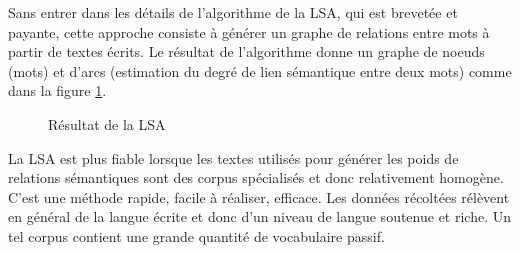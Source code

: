 \documentclass[a4paper,11pt,french]{article}
\begin{document}
Sans entrer dans les détails de l'algorithme de la LSA, qui est brevetée et payante, cette approche consiste à générer un graphe de relations entre mots à partir de textes écrits. Le résultat de l'algorithme donne un graphe de noeuds (mots) et d'arcs (estimation du degré de lien sémantique entre deux mots) comme dans la figure \ref{fig:lsa}.


  \begin{figure}

  \begin{center}


  \end{center}
  \caption{Résultat de la LSA}
  \label{fig:lsa}
\end{figure}


La LSA est plus fiable lorsque les textes utilisés pour générer les poids de relations sémantiques sont des corpus spécialisés et donc relativement homogène. C'est une méthode rapide, facile à réaliser, efficace. Les données récoltées rélèvent en général de la langue écrite et donc d'un niveau de langue soutenue et riche. Un tel corpus contient une grande quantité de vocabulaire passif. 
\end{document}
